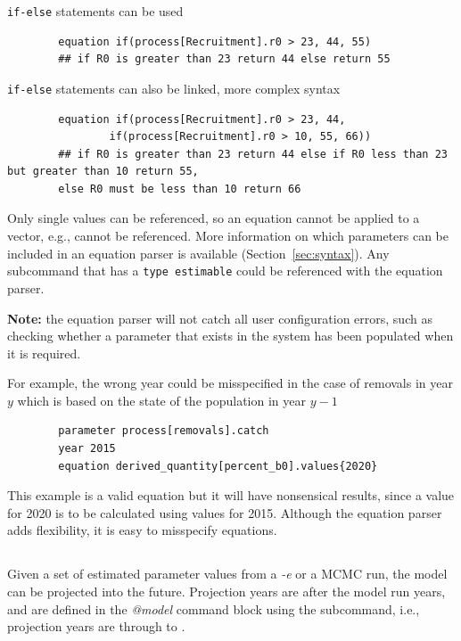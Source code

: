 \texttt{if-else} statements can be used

{\small{\begin{verbatim}
		equation if(process[Recruitment].r0 > 23, 44, 55)
		## if R0 is greater than 23 return 44 else return 55
		\end{verbatim}}}

\texttt{if-else} statements can also be linked, more complex syntax

{\small{\begin{verbatim}
		equation if(process[Recruitment].r0 > 23, 44,
         		if(process[Recruitment].r0 > 10, 55, 66))
		## if R0 is greater than 23 return 44 else if R0 less than 23 but greater than 10 return 55,
		else R0 must be less than 10 return 66
		\end{verbatim}}}

Only single values can be referenced, so an equation cannot be applied to a vector, e.g.,  cannot be referenced. More information on which parameters can be included in an equation parser is available (Section~\ref{sec:syntax}). Any subcommand that has a \texttt{type estimable} could be referenced with the equation parser.

\textbf{Note:} the equation parser will not catch all user configuration errors, such as checking whether a parameter that exists in the system has been populated when it is required.

For example, the wrong year could be misspecified in the case of removals in year $y$ which is based on the state of the population in year $y-1$

{\small{\begin{verbatim}
		parameter process[removals].catch
		year 2015
		equation derived_quantity[percent_b0].values{2020}
		\end{verbatim}}}

This example is a valid equation but it will have nonsensical results, since a value for 2020 is to be calculated using values for 2015. Although the equation parser adds flexibility, it is easy to misspecify equations.


\subsection{}\label{sec:projection}

Given a set of estimated parameter values from a \textit{-e} or a MCMC run, 
the model can be projected into the future. Projection years are after the model run years, and are defined in the \textit{@model} command block using the  subcommand, i.e., projection years are  through to .

